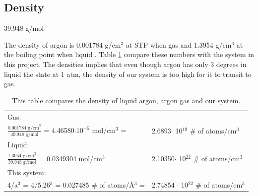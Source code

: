 \subsection{Density}

39.948 g/mol

The density of argon is 0.001784 g/cm$^3$ at STP when gas and 1.3954 g/cm$^3$ at the boiling point when liquid \cite{argon}. Table \ref{tab:density} compare these numbers with the system in this project. The densities implies that even though argon has only 3 degrees in liquid the state at 1 atm, the density of our system is too high for it to transit to gas. 

\begin{table}\caption{This table compares the density of liquid argon, argon gas and our system.}\label{tab:density}
\begin{tabular}{ll}
Gas:& \\
$\frac{0.001784 \text{ g/cm}^3 }{39.948 \text{ g/mol}}$ = 4.46580$\cdot 10^{-5}$ mol/cm$^3$ = & 2.6893$\cdot$ 10$^{19}$ \# of atoms/cm$^3$\\
Liquid:&\\
$\frac{1.3954 \text{ g/cm}^3 }{39.948 \text{ g/mol}}$ = 0.0349304 mol/cm$^3$ =& 2.10350$\cdot$ 10$^{22}$ \# of atoms/cm$^3$\\
This system:& \\
 4/a$^3$ = 4/5.26$^3$ = 0.027485 \# of atoms/Å$^3$ =& 2.74854 $\cdot$ 10$^{22}$ \# of atoms/cm$^3$\\
\end{tabular}
\end{table}